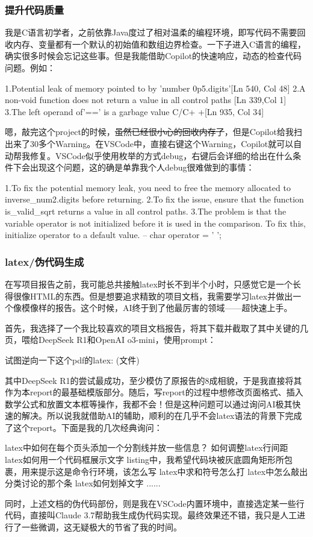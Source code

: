 \documentclass[11pt]{article}
\begin{document}
\subsubsection{提升代码质量}
我是C语言初学者，之前依靠Java度过了相对温柔的编程环境，即写代码不需要回收内存、变量都有一个默认的初始值和数组边界检查。一下子进入C语言的编程，确实很多时候会忘记这些事。但是我能借助Copilot的快速响应，动态的检查代码问题。例如：
\begin{commandline}
    1.Potential leak of memory pointed to by 'number 0p5.digits'[Ln 540, Col 48]
    2.A non-void function does not return a value in all control paths [Ln 339,Col 1]
    3.The left operand of'==' is a garbage value C/C+ +[Ln 935, Col 34]
\end{commandline}
嗯，敲完这个project的时候，\sout{虽然已经很小心的回收内存了}，但是Copilot给我扫出来了30多个Warning。在VSCode中，直接右键这个Warning，Copilot就可以自动帮我修复。VSCode似乎使用枚举的方式debug，右键后会详细的给出在什么条件下会出现这个问题，这的确是单靠我个人debug很难做到的事情：
\begin{commandline}
    1.To fix the potential memory leak, you need to free the memory allocated to inverse_num2.digits before returning. 
    2.To fix the issue, ensure that the function is_valid_sqrt returns a value in all control paths. 
    3.The problem is that the variable operator is not initialized before it is used in the comparison. To fix this, initialize operator to a default value.  -- char operator = ' ';
\end{commandline}

\subsubsection{latex/伪代码生成}
在写项目报告之前，我可能总共接触latex时长不到半个小时，只感觉它是一个长得很像HTML的东西。但是想要追求精致的项目文档，我需要学习latex并做出一个像模像样的报告。这个时候，AI终于到了他最厉害的领域——超快速上手。



首先，我选择了一个我比较喜欢的项目文档报告，将其下载并截取了其中关键的几页，喂给DeepSeek R1和OpenAI o3-mini，使用prompt：
\begin{commandline}
    试图逆向一下这个pdf的latex: (文件)
\end{commandline}
其中DeepSeek R1的尝试最成功，至少模仿了原报告的8成相貌，于是我直接将其作为本report的最基础模版部分。随后，写report的过程中想修改页面格式、插入数学公式和放置文本框等操作，我都不会！但是这种问题可以通过询问AI极其快速的解决。所以说我就借助AI的辅助，顺利的在几乎不会latex语法的背景下完成了这个report。下面是我的几次经典询问：
\begin{commandline}
    latex中如何在每个页头添加一个分割线并放一些信息？
    如何调整latex行间距
    latex如何用一个代码框展示文字
    listing中，我希望代码块被灰底圆角矩形所包裹，用来提示这是命令行环境，该怎么写
    latex中求和符号怎么打
    latex中怎么敲出分类讨论的那个条
    latex如何划掉文字
    ......
\end{commandline}
同时，上述文档的伪代码部份，则是我在VSCode内置环境中，直接选定某一些行代码，直接叫Claude 3.7帮助我生成伪代码实现。最终效果还不错，我只是人工进行了一些微调，这无疑极大的节省了我的时间。
\end{document}
